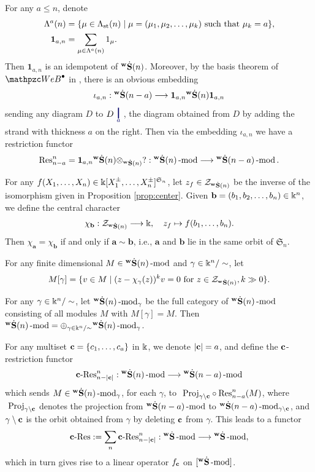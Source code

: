 For any $a\le n$, denote
\begin{align} \label{eq:1an}
\begin{split}
\Lambda^a(n) &=\{\mu\in \Lambda_{\text{st}}(n)\mid \mu=(\mu_1,\mu_2,\ldots,\mu_k) \text{ such that } \mu_k=a\},
\\
\mathbf{1}_{a,n} &= \sum_{\mu\in \Lambda^a(n)}1_\mu. 
\end{split}
\end{align}
Then $\mathbf{1}_{a,n}$ is an idempotent of ${}^{\bold{w}}\dot{\bold{S}}(n)$. Moreover, by the basis theorem of $\qAW$ in \cite[Theorem 4.16]{SSW25},  there is an obvious embedding
\begin{equation}
\label{equ:embedding}
 \iota_{a,n}: {}^{\bold{w}}\dot{\bold{S}}(n-a) \longrightarrow \mathbf{1}_{a,n}{}^{\bold{w}}\dot{\bold{S}}(n)\mathbf{1}_{a,n}   
\end{equation}
sending any diagram $D$ to $D\stra$, the diagram obtained from $D$ by adding the  strand with thickness $a$ on the right.  
Then via the embedding $\iota_{a,n}$ we have a restriction functor
\[ \text{Res}^{n}_{n-a}=\mathbf{1}_{a,n}{}^{\bold{w}}\dot{\bold{S}}(n)\otimes _{{}^{\bold{w}}\dot{\bold{S}}(n)}?: {}^{\bold{w}}\dot{\bold{S}}(n)\operatorname{-mod}\nolimits\longrightarrow {}^{\bold{w}}\dot{\bold{S}}(n-a)\operatorname{-mod}\nolimits .\]

For any $f(X_1,\ldots,X_n)\in \Bbbk[X_1^\pm,\ldots,X_n^\pm]^{\mathfrak S_n}$, let $z_f\in \mathcal{Z}_{{}^{\bold{w}}\dot{\bold{S}}(n)}$ be the inverse of the isomorphism given in Proposition \ref{prop:center}. Given $\mathbf b=(b_1,b_2,\ldots,b_n)\in \Bbbk^n$, we define the central character 
\[ 
\chi_{\mathbf b}: \mathcal{Z}_{{}^{\bold{w}}\dot{\bold{S}}(n)}\longrightarrow \Bbbk , \quad z_f\mapsto f(b_1,\ldots,b_n).
\]
Then $\chi_{\mathbf a}=\chi_{\mathbf b}$ if and only if $\mathbf a\sim \mathbf b$, i.e., $\mathbf a$ and $\mathbf b$ lie in the same orbit of $\mathfrak S_n$.

For any finite dimensional $M\in {}^{\bold{w}}\dot{\bold{S}}(n)\operatorname{-mod}\nolimits$ and $\gamma\in \Bbbk^n/\sim$, let 
\[
M[\gamma]= \{v\in M\mid (z-\chi_{\gamma}(z))^kv=0 \text{ for } z\in \mathcal{Z}_{{}^{\bold{w}}\dot{\bold{S}}(n)}, k\gg0\}. 
\]

For any $\gamma\in \Bbbk^n/\sim$, let 
${}^{\bold{w}}\dot{\bold{S}}(n)\operatorname{-mod}\nolimits_\gamma$ be the full category of ${}^{\bold{w}}\dot{\bold{S}}(n)\operatorname{-mod}\nolimits$ consisting of all modules $M$ with $M[\gamma]=M$.
Then $ {}^{\bold{w}}\dot{\bold{S}}(n)\operatorname{-mod}\nolimits=\oplus_{\gamma\in \Bbbk^n/\sim}{}^{\bold{w}}\dot{\bold{S}}(n)\operatorname{-mod}\nolimits_\gamma $. 
 
For any multiset $\mathbf{c}=\{c_1,\ldots,c_a\}$ in $\Bbbk$, we denote $|\mathbf{c}|=a$, and define the $\mathbf{c}$-restriction functor 
\begin{align}  \label{iRes_affine_n}
\mathbf{c}\text{-Res}^n_{n-|\mathbf{c}|}: {}^{\bold{w}}\dot{\bold{S}}(n)\operatorname{-mod}\nolimits\longrightarrow {}^{\bold{w}}\dot{\bold{S}}(n-a)\operatorname{-mod}\nolimits
\end{align}
which sends $M \in {}^{\bold{w}}\dot{\bold{S}}(n)\operatorname{-mod}\nolimits_\gamma$,
for each $\gamma$, to $ \text{ Proj}_{\gamma\setminus\mathbf{c}}\circ\text{Res}^n_{n-a}(M)$, where $ \text{ Proj}_{\gamma\setminus \mathbf{c}}$ denotes the projection from ${}^{\bold{w}}\dot{\bold{S}}(n-a)\operatorname{-mod}\nolimits $ to ${}^{\bold{w}}\dot{\bold{S}}(n-a)\operatorname{-mod}\nolimits_{\gamma\setminus \mathbf{c}}$, and  $\gamma\setminus \mathbf{c} $ is the orbit obtained from $\gamma$ by deleting $\mathbf{c}$ from $\gamma$.
 This leads to a functor 
\begin{align}  \label{iRes_affine}
\mathbf{c}\text{-Res} := \sum_{n} \mathbf{c}\text{-Res}^n_{n-|\mathbf{c}|}: {}^{\bold{w}}\dot{\bold{S}}\operatorname{-mod}\nolimits \longrightarrow {}^{\bold{w}}\dot{\bold{S}}\operatorname{-mod}\nolimits, 
\end{align}
which in turn gives rise to a linear operator $f_{\mathbf{c}}$ on $[{}^{\bold{w}}\dot{\bold{S}}\operatorname{-mod}\nolimits]$.


